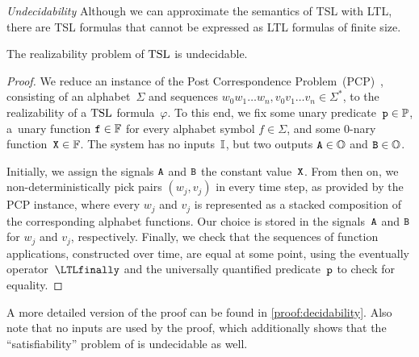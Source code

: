 \medskip

\goodbreak

\noindent \textit{Undecidability}
Although we can approximate the semantics of TSL with LTL, there are
TSL formulas that cannot be expressed as LTL formulas of finite
size.
%
\begin{theorem}\label{thm:decidability}
  The realizability problem of $ \text{TSL} $ is undecidable.
\end{theorem}
%
\begin{proof}
  We reduce an instance of the Post Correspondence
  Problem~(PCP)~\cite{post1946}, consisting of an alphabet~$ \Sigma $
  and sequences
  $ w_{0}w_{1}\ldots w_{n}, v_{0}v_{1}\ldots v_{n} \in \Sigma^{*} $,
  to the realizability of a $ \text{TSL} $ formula~$ \varphi $. To this end,
  we fix some unary predicate~$ {\text{\texttt{p}}} \in \mathbb{P} $, a~unary
  function $ {\text{\texttt{f}}} \in \mathbb{F} $ for every alphabet symbol
  $ f \in \Sigma $, and some $ 0 $-nary
  function~$ {\text{\texttt{X}}} \in \mathbb{F} $. The system has no
  inputs~$ \mathbb{I} $, but two outputs $ {\text{\texttt{A}}} \in \mathbb{O} $ and
  $ {\text{\texttt{B}}} \in \mathbb{O} $.

  Initially, we assign the signals $ {\text{\texttt{A}}} $ and $ {\text{\texttt{B}}} $ the
  constant value~$ {\text{\texttt{X}}} $. From then on, we non-deterministically
  pick pairs $ (w_{j},v_{j}) $ in every time step, as provided by the
  PCP instance, where every $ w_{j} $ and $ v_{j} $ is represented as
  a stacked composition of the corresponding alphabet functions. Our
  choice is stored in the signals~$ {\text{\texttt{A}}} $ and $ {\text{\texttt{B}}} $ for
  $ w_{j} $ and $ v_{j} $, respectively. Finally, we check that the
  sequences of function applications, constructed over time, are equal
  at some point, using the eventually operator~$ \LTLfinally $ and the
  universally quantified predicate~$ {\text{\texttt{p}}} $ to check for equality.
\end{proof}
%
\noindent A more detailed version of the proof can be found in
\cref{proof:decidability}. Also note that no inputs are used by
the proof, which additionally shows that the \mbox{``satisfiability''} problem of
\TSL is undecidable as well.
